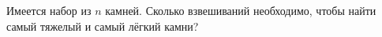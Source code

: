 Имеется набор из $n$ камней. Сколько взвешиваний необходимо, чтобы найти самый тяжелый и самый лёгкий
камни?
